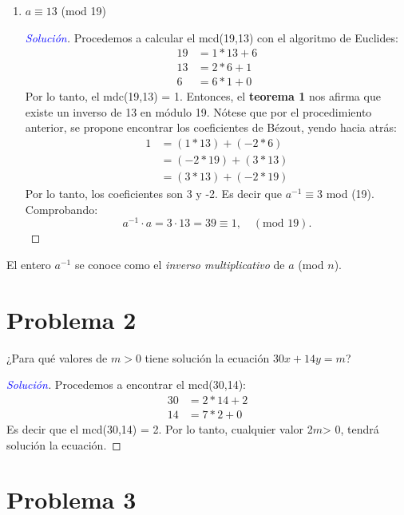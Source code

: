 \documentclass[a4paper,12pt]{article}
\newenvironment{solution}
  {\renewcommand\qedsymbol{$\square$}\begin{proof}[\textcolor{blue}{Solución}]}
  {\end{proof}}
\begin{document}
\begin{enumerate}
	\item  $a\equiv 13$ (mod 19)
	\begin{solution}
		Procedemos a calcular el mcd(19,13) con el algoritmo de Euclides: 
		\begin{align*}
			19 &= 1*13 + 6\\
			13 &= 2*6 + 1\\
			6 &= 6*1 + 0
		\end{align*}
		Por lo tanto, el mdc(19,13) = 1. Entonces, el \textbf{teorema 1} nos afirma que existe un inverso de 13 en módulo 19. Nótese que por el procedimiento anterior, se propone encontrar los coeficientes de Bézout, yendo hacia atrás:
		\begin{align*}
			1	&=	(1 * 13) + (-2 * 6)\\
			&=	(-2 * 19) + (3 * 13)\\
			&=	(3 * 13) + (-2 * 19)
		\end{align*}
		Por lo tanto, los coeficientes son 3  y -2. Es decir que $a^{-1}\equiv 3$ mod (19). Comprobando: 
		$$a^{-1}\cdot a = 3\cdot 13 = 39 \equiv 1, \quad (\text{mod 19}).$$
	\end{solution}
\end{enumerate}
El entero $a^{-1}$ se conoce como el \textit{inverso multiplicativo} de $a$ (mod $n$).

\section{Problema 2}

¿Para qué valores de $m > 0$ tiene solución la ecuación $30x + 14y = m$?

\begin{solution}
	Procedemos a encontrar el mcd(30,14): 
	\begin{align*}
		30 &= 2*14 + 2\\
		14 &= 7*2 + 0
	\end{align*}
Es decir que el mcd(30,14) = 2. Por lo tanto, cualquier valor 2$m$> 0, tendrá solución la ecuación. 
\end{solution}

\section{Problema 3}
\end{document}
